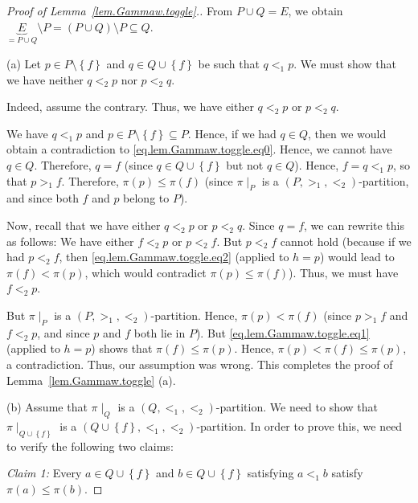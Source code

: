 \documentclass[12pt]{article}
\theoremstyle{plain}
\theoremstyle{definition}
\theoremstyle{remark}
\begin{document}
\begin{proof}[Proof of Lemma~\ref{lem.Gammaw.toggle}.]From
$P \cup Q = E$, we obtain $\underbrace{E}_{= P \cup Q}
\setminus P = \left(P \cup Q\right) \setminus P \subseteq Q$.

(a) Let $p \in P \setminus \left\{f\right\}$
and $q \in Q \cup \left\{f\right\}$ be such that
$q <_1 p$. We must show that we have neither $q <_2 p$ nor $p <_2 q$.

Indeed, assume the contrary. Thus, we have
either $q <_2 p$ or $p <_2 q$.

We have $q <_{1} p$ and
$p\in P\setminus\left\{  f\right\}  \subseteq P$. Hence, if we had $q\in Q$,
then we would obtain a contradiction to
\eqref{eq.lem.Gammaw.toggle.eq0}. Hence, we cannot have $q\in Q$.
Therefore, $q=f$ (since $q\in Q\cup\left\{  f\right\}  $ but not $q\in Q$).
Hence, $f=q<_{1}p$, so that $p>_{1}f$. Therefore, $\pi\left(  p\right)
\leq\pi\left(  f\right)  $ (since $\pi\mid_{P}$ is a
$\left(  P,>_{1},<_{2}\right)  $-partition, and since both $f$
and $p$ belong to $P$).

Now, recall that we have either $q <_2 p$ or $p <_2 q$.
Since $q = f$, we can rewrite this as follows:
We have either $f <_2 p$ or $p <_2 f$.
But $p<_{2}f$ cannot hold (because if we had $p<_{2}f$, then
\eqref{eq.lem.Gammaw.toggle.eq2} (applied to $h=p$) would lead to
$\pi\left(  f\right)  <\pi\left(  p\right)  $, which would contradict
$\pi\left(  p\right)  \leq\pi\left(  f\right)  $).
Thus, we must have $f<_{2}p$.

But $\pi\mid_{P}$ is a $\left(  P,>_{1},<_{2}\right)  $-partition. Hence,
$\pi\left(  p\right)  <\pi\left(  f\right)  $ (since $p>_{1}f$ and $f<_{2}p$,
and since $p$ and $f$ both lie in $P$).
But \eqref{eq.lem.Gammaw.toggle.eq1} (applied to $h=p$) shows that
$\pi\left(  f\right)  \leq\pi\left(  p\right)  $. Hence, $\pi\left(  p\right)
<\pi\left(  f\right)  \leq\pi\left(  p\right)  $, a contradiction. Thus, our
assumption was wrong. This completes the proof of
Lemma~\ref{lem.Gammaw.toggle} (a).

(b) Assume that $\pi \mid_Q$ is a $\left(Q, <_1, <_2\right)$-partition. We need
to show that
$\pi \mid_{Q \cup \left\{f\right\}}$ is a
$\left(Q \cup \left\{f\right\}, <_1, <_2\right)$-partition.
In order
to prove this, we need to verify the following two claims:

\textit{Claim 1:} Every $a\in Q\cup\left\{  f\right\}  $ and $b\in
Q\cup\left\{  f\right\}  $ satisfying $a<_{1}b$ satisfy $\pi\left(  a\right)
\leq\pi\left(  b\right)  $.


\end{proof}
\end{document}
